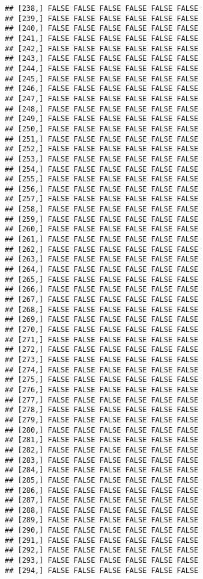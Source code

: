 \documentclass[
]{article}
\begin{document}
\begin{verbatim}
## [238,] FALSE FALSE FALSE FALSE FALSE FALSE
## [239,] FALSE FALSE FALSE FALSE FALSE FALSE
## [240,] FALSE FALSE FALSE FALSE FALSE FALSE
## [241,] FALSE FALSE FALSE FALSE FALSE FALSE
## [242,] FALSE FALSE FALSE FALSE FALSE FALSE
## [243,] FALSE FALSE FALSE FALSE FALSE FALSE
## [244,] FALSE FALSE FALSE FALSE FALSE FALSE
## [245,] FALSE FALSE FALSE FALSE FALSE FALSE
## [246,] FALSE FALSE FALSE FALSE FALSE FALSE
## [247,] FALSE FALSE FALSE FALSE FALSE FALSE
## [248,] FALSE FALSE FALSE FALSE FALSE FALSE
## [249,] FALSE FALSE FALSE FALSE FALSE FALSE
## [250,] FALSE FALSE FALSE FALSE FALSE FALSE
## [251,] FALSE FALSE FALSE FALSE FALSE FALSE
## [252,] FALSE FALSE FALSE FALSE FALSE FALSE
## [253,] FALSE FALSE FALSE FALSE FALSE FALSE
## [254,] FALSE FALSE FALSE FALSE FALSE FALSE
## [255,] FALSE FALSE FALSE FALSE FALSE FALSE
## [256,] FALSE FALSE FALSE FALSE FALSE FALSE
## [257,] FALSE FALSE FALSE FALSE FALSE FALSE
## [258,] FALSE FALSE FALSE FALSE FALSE FALSE
## [259,] FALSE FALSE FALSE FALSE FALSE FALSE
## [260,] FALSE FALSE FALSE FALSE FALSE FALSE
## [261,] FALSE FALSE FALSE FALSE FALSE FALSE
## [262,] FALSE FALSE FALSE FALSE FALSE FALSE
## [263,] FALSE FALSE FALSE FALSE FALSE FALSE
## [264,] FALSE FALSE FALSE FALSE FALSE FALSE
## [265,] FALSE FALSE FALSE FALSE FALSE FALSE
## [266,] FALSE FALSE FALSE FALSE FALSE FALSE
## [267,] FALSE FALSE FALSE FALSE FALSE FALSE
## [268,] FALSE FALSE FALSE FALSE FALSE FALSE
## [269,] FALSE FALSE FALSE FALSE FALSE FALSE
## [270,] FALSE FALSE FALSE FALSE FALSE FALSE
## [271,] FALSE FALSE FALSE FALSE FALSE FALSE
## [272,] FALSE FALSE FALSE FALSE FALSE FALSE
## [273,] FALSE FALSE FALSE FALSE FALSE FALSE
## [274,] FALSE FALSE FALSE FALSE FALSE FALSE
## [275,] FALSE FALSE FALSE FALSE FALSE FALSE
## [276,] FALSE FALSE FALSE FALSE FALSE FALSE
## [277,] FALSE FALSE FALSE FALSE FALSE FALSE
## [278,] FALSE FALSE FALSE FALSE FALSE FALSE
## [279,] FALSE FALSE FALSE FALSE FALSE FALSE
## [280,] FALSE FALSE FALSE FALSE FALSE FALSE
## [281,] FALSE FALSE FALSE FALSE FALSE FALSE
## [282,] FALSE FALSE FALSE FALSE FALSE FALSE
## [283,] FALSE FALSE FALSE FALSE FALSE FALSE
## [284,] FALSE FALSE FALSE FALSE FALSE FALSE
## [285,] FALSE FALSE FALSE FALSE FALSE FALSE
## [286,] FALSE FALSE FALSE FALSE FALSE FALSE
## [287,] FALSE FALSE FALSE FALSE FALSE FALSE
## [288,] FALSE FALSE FALSE FALSE FALSE FALSE
## [289,] FALSE FALSE FALSE FALSE FALSE FALSE
## [290,] FALSE FALSE FALSE FALSE FALSE FALSE
## [291,] FALSE FALSE FALSE FALSE FALSE FALSE
## [292,] FALSE FALSE FALSE FALSE FALSE FALSE
## [293,] FALSE FALSE FALSE FALSE FALSE FALSE
## [294,] FALSE FALSE FALSE FALSE FALSE FALSE

\end{verbatim}
\end{document}

